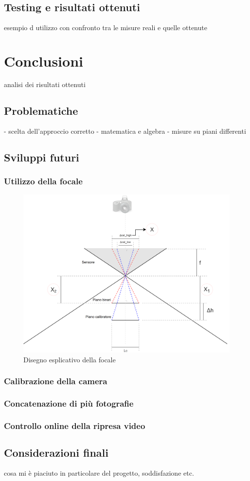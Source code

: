 \documentclass[twoside]{supsistudent}
\begin{document}
\section{Testing e risultati ottenuti}
esempio d utilizzo con confronto tra le misure reali e quelle ottenute

\chapter{Conclusioni}
analisi dei risultati ottenuti 

\section{Problematiche}
- scelta dell'approccio corretto
- matematica e algebra
- misure su piani differenti

\section{Sviluppi futuri}
\subsection{Utilizzo della focale}
\begin{figure}[H]
  \center
  \includegraphics[scale=0.45]{images/ProblemaAltezza.png}
  \caption{Disegno esplicativo della focale}
\end{figure}
\subsection{Calibrazione della camera}
\subsection{Concatenazione di più fotografie}
\subsection{Controllo online della ripresa video}

\section{Considerazioni finali}
cosa mi è piaciuto in particolare del progetto, soddisfazione etc.

\nocite{*}

\end{document}
